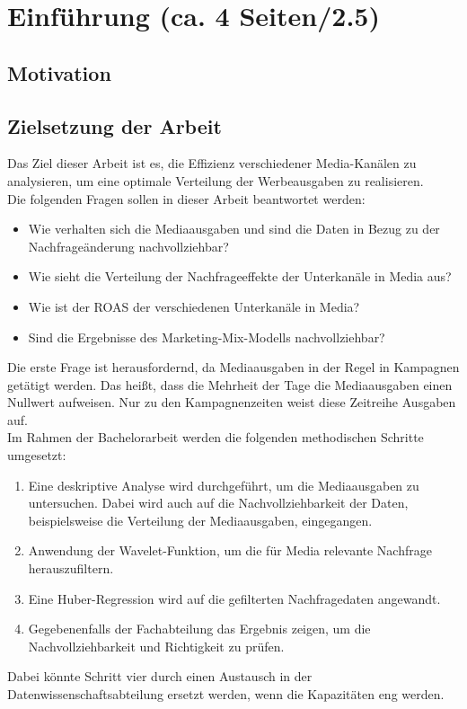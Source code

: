 
\newpage
\section{Einführung (ca. 4 Seiten/2.5)}
\label{Einführung}
\subsection{Motivation}
\iffalse
Erkläre, warum das Thema Media \ac{ROAS} im Kontext von bonprix relevant ist.
Diskutiere die Bedeutung von Marketing-Analysen in der heutigen digitalen Welt und wie sie Unternehmen helfen, ihre Strategien zu optimieren.
Füge aktuelle Statistiken oder Beispiele aus der Branche hinzu, um deine Argumente zu untermauern.
\fi
\subsection{Zielsetzung der Arbeit}

Das Ziel dieser Arbeit ist es, die Effizienz verschiedener Media-Kanälen zu analysieren, um eine optimale Verteilung der Werbeausgaben zu realisieren. \\
Die folgenden Fragen sollen in dieser Arbeit beantwortet werden:
\begin{itemize}
    \item Wie verhalten sich die Mediaausgaben und sind die Daten in Bezug zu der Nachfrageänderung nachvollziehbar? 
    \item Wie sieht die Verteilung der Nachfrageeffekte der Unterkanäle in Media aus?
    \item  Wie ist der ROAS der verschiedenen Unterkanäle in Media?
    \item Sind die Ergebnisse des Marketing-Mix-Modells nachvollziehbar? 
\end{itemize} 
Die erste Frage ist herausfordernd, da Mediaausgaben in der Regel in Kampagnen getätigt werden. Das heißt, dass die Mehrheit der Tage die Mediaausgaben einen Nullwert aufweisen. Nur zu den Kampagnenzeiten weist diese Zeitreihe Ausgaben auf.\\
Im Rahmen der Bachelorarbeit werden die folgenden methodischen Schritte umgesetzt:
\begin{enumerate}
    \item Eine deskriptive Analyse wird durchgeführt, um die Mediaausgaben zu untersuchen. Dabei wird auch auf die Nachvollziehbarkeit der Daten, beispielsweise die Verteilung der Mediaausgaben, eingegangen.
    \item Anwendung der Wavelet-Funktion, um die für Media relevante Nachfrage herauszufiltern.
    \item Eine Huber-Regression wird auf die gefilterten Nachfragedaten angewandt.
    \item Gegebenenfalls der Fachabteilung das Ergebnis zeigen, um die Nachvollziehbarkeit und Richtigkeit zu prüfen.
\end{enumerate}
Dabei könnte Schritt vier durch einen Austausch in der Datenwissenschaftsabteilung ersetzt werden, wenn die Kapazitäten eng werden.   
